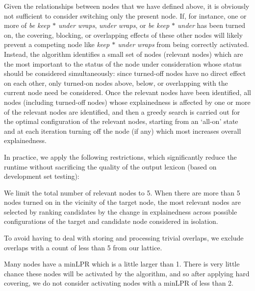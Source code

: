 \documentclass[11pt,letterpaper]{article}
\newcommand{\gap}{$*$\xspace}
\newcommand{\ex}[1]{\textit{#1}\xspace}
\begin{document}
Given the relationships between nodes that we have defined above, it is obviously not sufficient to consider switching only the present node. If, for instance, one or more of \ex{be keep \gap under wraps}, \ex{under wraps}, or \ex{be keep \gap under} has been turned on, the covering, blocking, or overlapping effects of these other nodes will likely prevent a competing node like \ex{keep \gap under wraps} from being correctly activated. Instead, the algorithm identifies a small set of nodes (relevant nodes) which are the most important to the status of the node under consideration whose status should be considered simultaneously: since turned-off nodes have no direct effect on each other, only turned-on nodes above, below, or overlapping with the current node need be considered.  Once the relevant nodes have been identified, all nodes (including turned-off nodes) whose explainedness is affected by one or more of the relevant nodes are identified, and then a greedy search is carried out for the optimal configuration of the relevant nodes, starting from an `all-on' state and at each iteration turning off the node (if any) which most increases overall explainedness.

In practice, we apply the following restrictions, which significantly reduce the runtime without sacrificing the quality of the output lexicon (based on development set testing):
\begin{compactitem}
\item We limit the total number of relevant nodes to 5. When there are more than 5 nodes turned on in the vicinity of the target node, the most relevant nodes are selected by ranking candidates by the change in explainedness across possible configurations of the target and candidate node considered in isolation.
\item To avoid having to deal with storing and processing trivial overlaps, we exclude overlaps with a count of less than 5 from our lattice.
\item Many nodes have a minLPR which is a little larger than 1. There is very little chance these nodes will be activated by the algorithm, and so after applying hard covering, we do not consider activating nodes with a minLPR of less than 2.
\end{compactitem}
\end{document}
